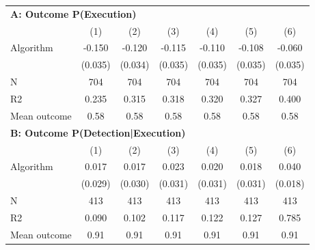 \begin{tabular}{lcccccc} \toprule
\multicolumn{7}{l}{\textbf{A: Outcome P(Execution)}} \\ \multicolumn{1}{l}{} & (1) & (2) & (3) & (4) & (5) & (6) \\ \midrule
Algorithm   &      -0.150\sym{***}&      -0.120\sym{***}&      -0.115\sym{***}&      -0.110\sym{***}&      -0.108\sym{***}&      -0.060\sym{*}  \\
            &     (0.035)         &     (0.034)         &     (0.035)         &     (0.035)         &     (0.035)         &     (0.035)         \\
\midrule
N           &         704         &         704         &         704         &         704         &         704         &         704         \\
R2          &       0.235         &       0.315         &       0.318         &       0.320         &       0.327         &       0.400         \\
Mean outcome&        0.58         &        0.58         &        0.58         &        0.58         &        0.58         &        0.58         \\

\midrule \multicolumn{7}{l}{\textbf{B: Outcome P(Detection|Execution)}} \\ \multicolumn{1}{l}{} & (1) & (2) & (3) & (4) & (5) & (6) \\ \midrule
Algorithm   &       0.017         &       0.017         &       0.023         &       0.020         &       0.018         &       0.040\sym{**} \\
            &     (0.029)         &     (0.030)         &     (0.031)         &     (0.031)         &     (0.031)         &     (0.018)         \\
\midrule
N           &         413         &         413         &         413         &         413         &         413         &         413         \\
R2          &       0.090         &       0.102         &       0.117         &       0.122         &       0.127         &       0.785         \\
Mean outcome&        0.91         &        0.91         &        0.91         &        0.91         &        0.91         &        0.91         \\


\end{tabular}
